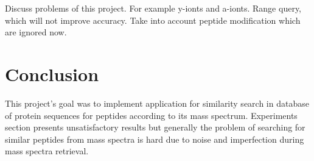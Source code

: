 \documentclass[a4paper,10pt,twocolumn]{article}
\begin{document}
Discuss problems of this project. For example y-ionts and a-ionts.
Range query, which will not improve accuracy. Take into account peptide
modification which are ignored now.

\section{Conclusion}

This project's goal was to implement application for similarity search in
database of protein sequences for peptides according to its mass spectrum.
Experiments section presents unsatisfactory results but generally the problem
of searching for similar peptides from mass spectra is hard due to noise and
imperfection during mass spectra retrieval.

{}

\end{document}
